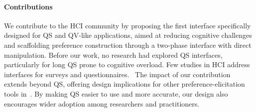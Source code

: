 
\paragraph{Contributions}
We contribute to the HCI community by proposing the first interface specifically designed for QS and QV-like applications, aimed at reducing cognitive challenges and scaffolding preference construction through a two-phase interface with direct manipulation. Before our work, no research had explored QS interfaces, particularly for long QS prone to cognitive overload. Few studies in HCI address interfaces for surveys and questionnaires.~ The impact of our contribution extends beyond QS, offering design implications for other preference-elicitation tools in~. By making QS easier to use and more accurate, our design also encourages wider adoption among researchers and practitioners.~


